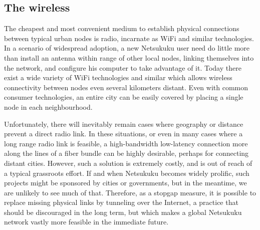 \documentclass[a4paper]{article}
\begin{document}
\subsection{The wireless}

The cheapest and most convenient medium to establish physical connections between 
typical urban nodes is radio, incarnate as WiFi and similar technologies.  
In a scenario of widespread adoption, a new Netsukuku user need do little more
than install an antenna within range of other local nodes, linking themselves
into the network, and configure his computer to take advantage of it. 
Today there exist a wide variety of WiFi technologies and similar which allows 
wireless connectivity between nodes even several kilometers distant.  
Even with common consumer technologies, an entire city can be easily covered
by placing a single node in each neighbourhood.

Unfortunately, there will inevitably remain cases where geography or
distance prevent a direct radio link. In these situations, or even 
in many cases where a long range radio link is feasible, a high-bandwidth 
low-latency connection more along the lines of a fiber bundle can be
highly desirable, perhaps for connecting distant cities.  
However, such a solution is extremely costly, and is out of reach 
of a typical grassroots effort.  If and when Netsukuku becomes 
widely prolific, such projects might be sponsored by cities or
governments, but in the meantime, we are unlikely to see much of that.  
Therefore, as a stopgap measure, it is possible to replace missing 
physical links by tunneling over the Internet\cite{inetdoc}, a practice 
that should be discouraged in the long term, but which makes a global
Netsukuku network vastly more feasible in the immediate future.


\end{document}
